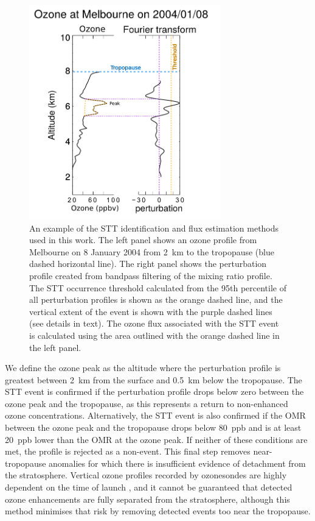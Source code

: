 \documentclass[acp, manuscript]{copernicus} %
\begin{document}
    \begin{figure}[t]
      \includegraphics[width=8.3cm]{figures/filtereg.png}
      \caption{ %
	An example of the STT identification and flux estimation methods used in this work. 
	The left panel shows an ozone profile from Melbourne on 8 January 2004 from 2~km to the tropopause (blue dashed horizontal line).
	The right panel shows the perturbation profile created from bandpass filtering of the mixing ratio profile. The STT occurrence threshold calculated from the 95th percentile of all perturbation profiles is shown as the orange dashed line, and the vertical extent of the event is shown with the purple dashed lines (see details in text).
	The ozone flux associated with the STT event is calculated using the area outlined with the orange dashed line in the left panel.
      }
      \label{fig:filterEG}
    \end{figure}

    We define the ozone peak as the altitude where the perturbation profile is greatest between 2~km from the surface and 0.5~km below the tropopause.
    The STT event is confirmed if the perturbation profile drops below zero between the ozone peak and the tropopause, as this represents a return to non-enhanced ozone concentrations.
    Alternatively, the STT event is also confirmed if the OMR between the ozone peak and the tropopause drops below 80~ppb and is at least 20~ppb lower than the OMR at the ozone peak. 
    If neither of these conditions are met, the profile is rejected as a non-event.
    This final step removes near-tropopause anomalies for which there is insufficient evidence of detachment from the stratosphere.
    Vertical ozone profiles recorded by ozonesondes are highly dependent on the time of launch \citep{Sprenger2003}, and it cannot be guaranteed that detected ozone enhancements are fully separated from the stratosphere, although this method minimises that risk by removing detected events too near the tropopause.
\end{document}
